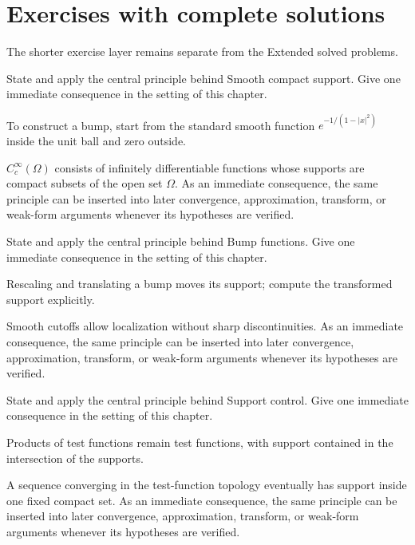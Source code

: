 \section{Exercises with complete solutions}
The shorter exercise layer remains separate from the Extended solved problems.

\begin{exercise}\label{exr:iii15-01}
State and apply the central principle behind Smooth compact support. Give one immediate consequence in the setting of this chapter.
\end{exercise}
\begin{hint}
To construct a bump, start from the standard smooth function \(e^{-1/(1-|x|^2)}\) inside the unit ball and zero outside.
\end{hint}
\begin{solution}
$C_c^\infty(\Omega)$ consists of infinitely differentiable functions whose supports are compact subsets of the open set $\Omega$. As an immediate consequence, the same principle can be inserted into later convergence, approximation, transform, or weak-form arguments whenever its hypotheses are verified.
\end{solution}

\begin{exercise}\label{exr:iii15-02}
State and apply the central principle behind Bump functions. Give one immediate consequence in the setting of this chapter.
\end{exercise}
\begin{hint}
Rescaling and translating a bump moves its support; compute the transformed support explicitly.
\end{hint}
\begin{solution}
Smooth cutoffs allow localization without sharp discontinuities. As an immediate consequence, the same principle can be inserted into later convergence, approximation, transform, or weak-form arguments whenever its hypotheses are verified.
\end{solution}

\begin{exercise}\label{exr:iii15-03}
State and apply the central principle behind Support control. Give one immediate consequence in the setting of this chapter.
\end{exercise}
\begin{hint}
Products of test functions remain test functions, with support contained in the intersection of the supports.
\end{hint}
\begin{solution}
A sequence converging in the test-function topology eventually has support inside one fixed compact set. As an immediate consequence, the same principle can be inserted into later convergence, approximation, transform, or weak-form arguments whenever its hypotheses are verified.
\end{solution}

